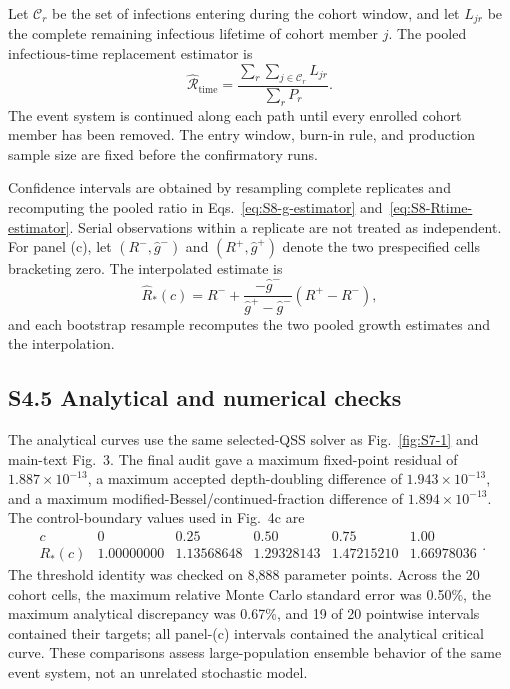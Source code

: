 \documentclass[11pt]{article}
\begin{document}
Let $\mathcal C_r$ be the set of infections entering during the cohort window, and let $L_{jr}$ be the complete remaining infectious lifetime of cohort member $j$. The pooled infectious-time replacement estimator is
\begin{equation}
\widehat{\mathcal R}_{\mathrm{time}}
=
\frac{\displaystyle\sum_r\sum_{j\in\mathcal C_r}L_{jr}}
{\displaystyle\sum_rP_r}.
\label{eq:S8-Rtime-estimator}
\end{equation}
The event system is continued along each path until every enrolled cohort member has been removed. The entry window, burn-in rule, and production sample size are fixed before the confirmatory runs.

Confidence intervals are obtained by resampling complete replicates and recomputing the pooled ratio in Eqs.~\eqref{eq:S8-g-estimator} and~\eqref{eq:S8-Rtime-estimator}. Serial observations within a replicate are not treated as independent. For panel (c), let $(R^-,\widehat g^-)$ and $(R^+,\widehat g^+)$ denote the two prespecified cells bracketing zero. The interpolated estimate is
\begin{equation}
\widehat R_*(c)
=R^-+
\frac{-\widehat g^-}{\widehat g^+-\widehat g^-}
(R^+-R^-),
\label{eq:S8-threshold-estimator}
\end{equation}
and each bootstrap resample recomputes the two pooled growth estimates and the interpolation.

\subsection*{S4.5 Analytical and numerical checks}

The analytical curves use the same selected-QSS solver as Fig.~\ref{fig:S7-1} and main-text Fig.~3. The final audit gave a maximum fixed-point residual of $1.887\times10^{-13}$, a maximum accepted depth-doubling difference of $1.943\times10^{-13}$, and a maximum modified-Bessel/continued-fraction difference of $1.894\times10^{-13}$. The control-boundary values used in Fig.~4c are
\begin{equation}
\begin{array}{c|ccccc}
c & 0 & 0.25 & 0.50 & 0.75 & 1.00\\ \hline
R_*(c) & 1.00000000 & 1.13568648 & 1.29328143 & 1.47215210 & 1.66978036
\end{array}.
\label{eq:S8-critical-values}
\end{equation}
The threshold identity was checked on 8,888 parameter points. Across the 20 cohort cells, the maximum relative Monte Carlo standard error was 0.50\%, the maximum analytical discrepancy was 0.67\%, and 19 of 20 pointwise intervals contained their targets; all panel-(c) intervals contained the analytical critical curve. These comparisons assess large-population ensemble behavior of the same event system, not an unrelated stochastic model.
\end{document}
